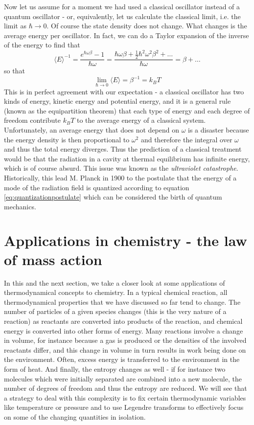 \documentclass[a4paper, draft]{article}
\theoremstyle{own}
\theoremstyle{remark}
\begin{document}
Now let us assume for a moment we had used a classical oscillator instead of a quantum oscillator - or, equivalently, let us calculate the classical limit, i.e. the limit as 
$\hbar \rightarrow 0$. Of course the state density does not change. What changes is the average energy per oscillator. In fact, we can do a Taylor expansion of the inverse of the energy to find that
$$
{\langle E \rangle}^{-1} = \frac{e^{\hbar \omega \beta} - 1}{\hbar \omega}
= \frac{\hbar \omega \beta + \frac{1}{2} \hbar^2 \omega^2 \beta^2 + \dots }{\hbar \omega}
= \beta + \dots
$$
so that
$$
\lim_{\hbar \rightarrow 0} \langle E \rangle = \beta^{-1} = k_B T
$$
This is in perfect agreement with our expectation - a classical oscillator has two kinds of energy, kinetic energy and potential energy, and it is a general rule (known as the equipartition theorem) that each type of energy and each degree of freedom contribute $k_B T$ to the average energy of a classical system. Unfortunately, an average energy that does not depend on $\omega$ is a disaster because the energy density is then proportional to $\omega^2$ and therefore the integral over $\omega$ and thus the total energy diverges. Thus the prediction of a classical treatment would be that the radiation in a cavity at thermal equilibrium has infinite energy, which is of course absurd. This issue was known as the {\em ultraviolet catastrophe}. Historically, this lead M. Planck in 1900 to the postulate that the energy of a mode of the radiation field is quantized according to equation \eqref{eq:quantizationpostulate} which can be considered the birth of quantum mechanics. 

\section{Applications in chemistry - the law of mass action}

In this and the next section, we take a closer look at some applications of thermodynamical concepts to chemistry. In a typical chemical reaction, all thermodynamical properties that we have discussed so far tend to change. The number of particles of a given species changes (this is the very nature of a reaction) as reactants are converted into products of the reaction, and chemical energy is converted into other forms of energy. Many reactions involve a change in volume, for instance because a gas is produced or the densities of the involved reactants differ, and this change in volume in turn results in work being done on the environment. Often, excess energy is transferred to the environment in the form of heat. And finally, the entropy changes as well - if for instance two molecules which were initially separated are combined into a new molecule, the number of degrees of freedom and thus the entropy are reduced. We will see that a strategy to deal with this complexity is to fix certain thermodynamic variables like temperature or pressure and to use Legendre transforms to effectively focus on some of the changing quantities in isolation.
\end{document}
